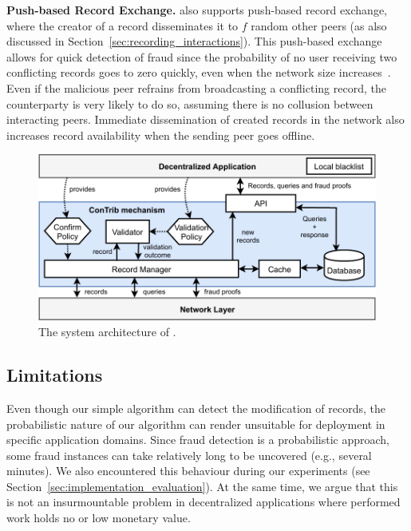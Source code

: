 \textbf{Push-based Record Exchange.}
\ModelName{} also supports push-based record exchange, where the creator of a record disseminates it to $ f $ random other peers (as also discussed in Section~\ref{sec:recording_interactions}).
This push-based exchange allows for quick detection of fraud since the probability of no user receiving two conflicting records goes to zero quickly, even when the network size increases~\cite{osipkov2007combating}.
Even if the malicious peer refrains from broadcasting a conflicting record, the counterparty is very likely to do so, assuming there is no collusion between interacting peers.
Immediate dissemination of created records in the network also increases record availability when the sending peer goes offline.

\begin{figure}[t]
	\centering
	\includegraphics[width=\linewidth]{trustchain/assets/system_architecture}
	\caption{The system architecture of \ModelName{}.}
	\label{fig:system_architecture}
\end{figure}

\subsection{Limitations}
Even though our simple algorithm can detect the modification of records, the probabilistic nature of our algorithm can render \ModelName{} unsuitable for deployment in specific application domains.
Since fraud detection is a probabilistic approach, some fraud instances can take relatively long to be uncovered (e.g., several minutes).
We also encountered this behaviour during our experiments (see Section~\ref{sec:implementation_evaluation}).
At the same time, we argue that this is not an insurmountable problem in decentralized applications where performed work holds no or low monetary value.

